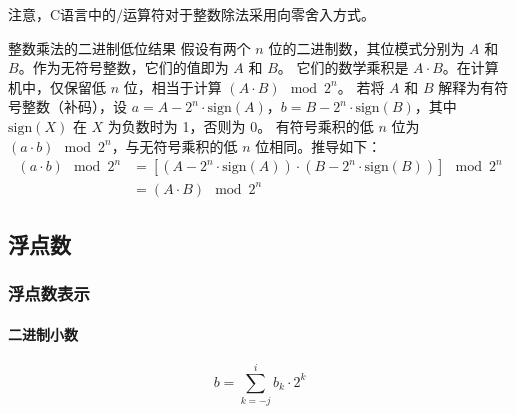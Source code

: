 注意，C语言中的$/$运算符对于整数除法采用向零舍入方式。

\begin{sidenote}{整数乘法的二进制低位结果}
    假设有两个 $n$ 位的二进制数，其位模式分别为 $A$ 和 $B$。作为无符号整数，它们的值即为 $A$ 和 $B$。
    它们的数学乘积是 $A \cdot B$。在计算机中，仅保留低 $n$ 位，相当于计算 $(A \cdot B) \mod 2^n$。
    若将 $A$ 和 $B$ 解释为有符号整数（补码），设 $a = A - 2^n \cdot \text{sign}(A)$，$b = B - 2^n \cdot \text{sign}(B)$，其中 $\text{sign}(X)$ 在 $X$ 为负数时为 1，否则为 0。
    有符号乘积的低 $n$ 位为 $(a \cdot b) \mod 2^n$，与无符号乘积的低 $n$ 位相同。推导如下：
    \begin{align*}
        (a \cdot b) \mod 2^n & = [(A - 2^n \cdot \text{sign}(A)) \cdot (B - 2^n \cdot \text{sign}(B))] \mod 2^n \\
                             & = (A \cdot B) \mod 2^n
    \end{align*}
\end{sidenote}

\subsection{浮点数}
\subsubsection{浮点数表示}

\paragraph{二进制小数}
$$ b = \sum_{k=-j}^{i} b_k \cdot 2^k $$

